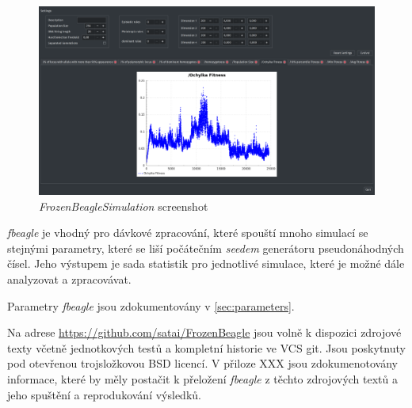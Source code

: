 \begin{figure}[h]
\centering
\includegraphics[totalheight=8cm]{img/Screenshot.pdf}
    \caption{\textit{FrozenBeagleSimulation} screenshot}
\label{fig:FrozenBeagleScreenshot}
\end{figure}


\textit{fbeagle} je vhodný pro dávkové zpracování, které spouští mnoho simulací se stejnými parametry, které se liší
počátečním \textit{seedem} generátoru pseudonáhodných čísel. Jeho výstupem je sada statistik pro jednotlivé simulace,
které je možné dále analyzovat a zpracovávat.

Parametry \textit{fbeagle} jsou zdokumentovány v \ref{sec:parameters}.

Na adrese \url {https://github.com/satai/FrozenBeagle} jsou volně k dispozici zdrojové texty včetně jednotkových testů
a kompletní historie ve VCS git. Jsou poskytnuty pod otevřenou trojsložkovou BSD licencí. V přiloze XXX jsou
zdokumenotovány informace, které by měly postačit k přeložení \textit{fbeagle} z těchto zdrojových textů
a jeho spuštění a reprodukování výsledků.

